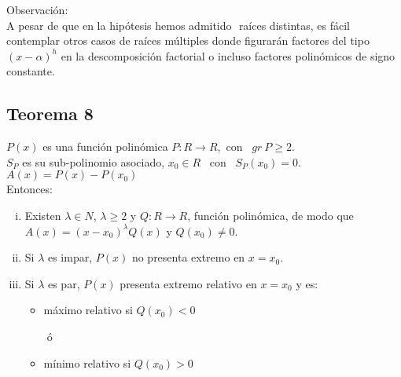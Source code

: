 \documentclass[12pt]{article}
\begin{document}
Observación:\\
A pesar de que en la hipótesis hemos admitido $ $ raíces distintas, es fácil contemplar otros casos de raíces múltiples donde figurarán factores del tipo $(x-\alpha)^h$ en la descomposición factorial o incluso factores polinómicos de signo constante.

\subsection{
  Teorema 8
}
$P(x)$ es una función polinómica $P:R \rightarrow R$,\  con \ $gr \ P \geqslant 2$.\\
${S}_P$ es su sub-polinomio asociado, ${x}_0 \in R$ \ con \ ${S}_P({x}_0)=0$. \ $A(x)=P(x)-P({x}_0)$ \\
Entonces: \\

\begin{enumerate}[i)]
  \item Existen $\lambda \in N$, $\lambda \geqslant 2$ y $Q:R \rightarrow R$, función polinómica, de modo que $A(x)=(x-{x}_0)^\lambda Q(x)$ y $Q({x}_0) \neq 0$.

  \item Si $\lambda$ es impar, $P(x)$ no presenta extremo en $x={x}_0$.

  \item Si $\lambda$ es par, $P(x)$ presenta extremo relativo en $x={x}_0$ y es:
        \begin{itemize}
          \item máximo relativo si $Q({x}_0)<0$
        \end{itemize}
        \ \ \ \ ó
        \begin{itemize}
          \item mínimo relativo si $Q({x}_0)>0$
        \end{itemize}
\end{enumerate}
\end{document}
